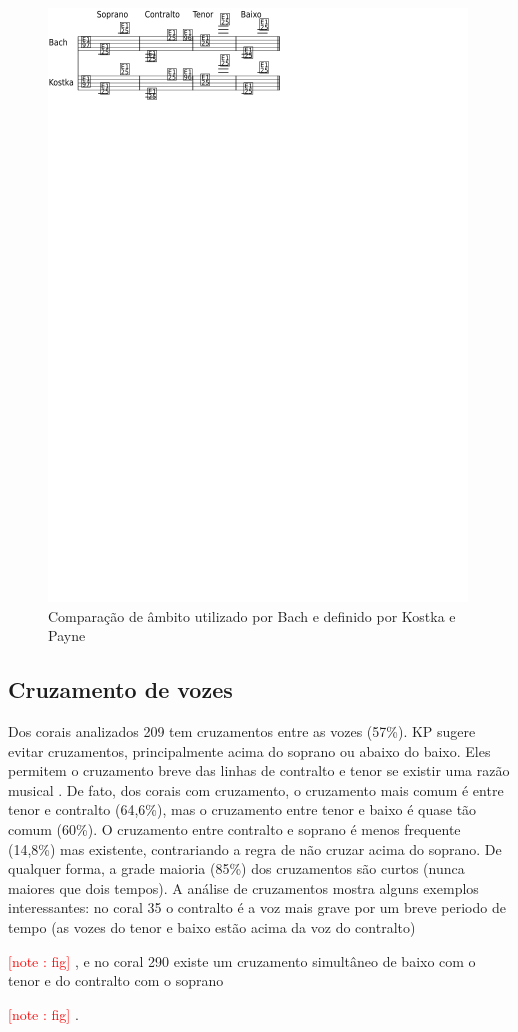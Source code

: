 \documentclass{article}
\newcounter{notecounter}
\newcommand{\note}[1]{
  \addtocounter{notecounter}{1}
  \textcolor{red}{[note \arabic{notecounter}: #1]}
}
\begin{document}
\begin{figure}
  \centering
  \includegraphics[scale=2.5]{ambitos}
  \caption{Comparação de âmbito utilizado por Bach e definido por
    Kostka e Payne}
  \label{fig:ambito-kostka}
\end{figure}

\subsection{Cruzamento de vozes}
\label{sec:cruzamento-de-vozes}

Dos corais analizados 209 tem cruzamentos entre as vozes (57\%). KP
sugere evitar cruzamentos, principalmente acima do soprano ou abaixo
do baixo. Eles permitem o cruzamento breve das linhas de contralto e
tenor se existir uma razão musical \cite[p. 79]{kostka.ea00:tonal}. De
fato, dos corais com cruzamento, o cruzamento mais comum é entre tenor
e contralto (64,6\%), mas o cruzamento entre tenor e baixo é quase tão
comum (60\%). O cruzamento entre contralto e soprano é menos frequente
(14,8\%) mas existente, contrariando a regra de não cruzar acima do
soprano. De qualquer forma, a grade maioria (85\%) dos cruzamentos são
curtos (nunca maiores que dois tempos). A análise de cruzamentos
mostra alguns exemplos interessantes: no coral 35 o contralto é a voz
mais grave por um breve periodo de tempo (as vozes do tenor e baixo estão
acima da voz do contralto) \note{fig}, e no coral 290 existe um
cruzamento simultâneo de baixo com o tenor e do contralto com o
soprano \note{fig}.
\end{document}
